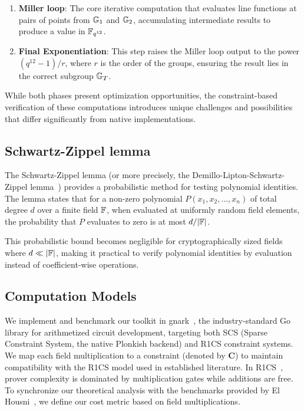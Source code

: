 \begin{enumerate}
    \item \textbf{Miller loop}: The core iterative computation that evaluates line functions at pairs of points from $\mathbb{G}_1$ and $\mathbb{G}_2$, accumulating intermediate results to produce a value in $\mathbb{F}_{q^{12}}$.
    
    \item \textbf{Final Exponentiation}: This step raises the Miller loop output to the power $(q^{12}-1)/r$, where $r$ is the order of the groups, ensuring the result lies in the correct subgroup $\mathbb{G}_T$.
\end{enumerate}

While both phases present optimization opportunities, the constraint-based verification of these computations introduces unique challenges and possibilities that differ significantly from native implementations.

\subsection{Schwartz-Zippel lemma}\label{sec:bg:sz}

The Schwartz-Zippel lemma (or more precisely, the Demillo-Lipton-Schwartz-Zippel lemma~\cite{DemLip78,Sch79,Zip79,Sch80}) provides a probabilistic method for testing polynomial identities. The lemma states that for a non-zero polynomial $P(x_1, x_2, \ldots, x_n)$ of total degree $d$ over a finite field $\mathbb{F}$, when evaluated at uniformly random field elements, the probability that $P$ evaluates to zero is at most $d/|\mathbb{F}|$.

This probabilistic bound becomes negligible for cryptographically sized fields where $d \ll |\mathbb{F}|$, making it practical to verify polynomial identities by evaluation instead of coefficient-wise operations.

\subsection{Computation Models}

We implement and benchmark our toolkit in gnark~\cite{gnark}, the industry-standard Go library for arithmetized circuit development, targeting both SCS (Sparse Constraint System, the native Plonkish backend) and R1CS constraint systems. We map each field multiplication to a constraint (denoted by \textbf{C}) to maintain compatibility with the R1CS model used in established literature. In R1CS~\cite{EC:Groth16}, prover complexity is dominated by multiplication gates while additions are free. To synchronize our theoretical analysis with the benchmarks provided by El Housni~\cite{ACNS:ElHousni23}, we define our cost metric based on field multiplications.

